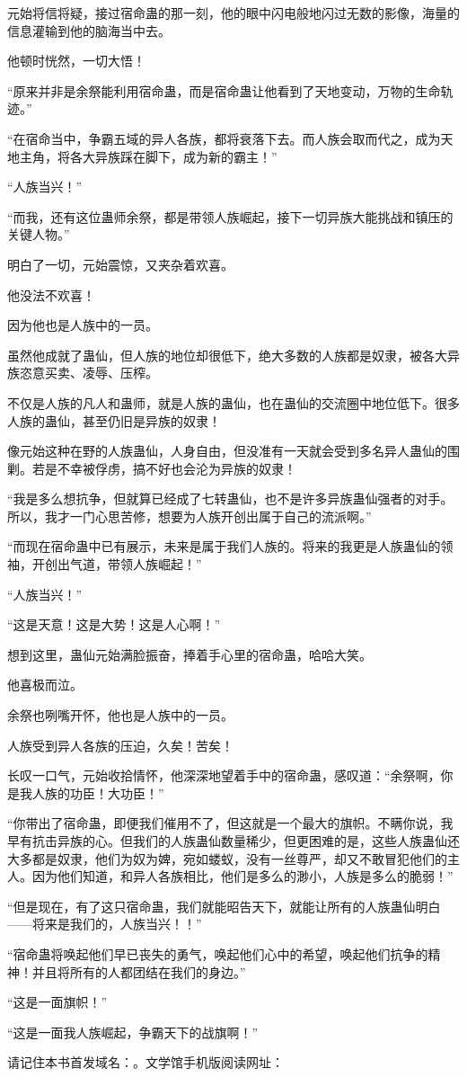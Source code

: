 \begin{this_body}
元始将信将疑，接过宿命蛊的那一刻，他的眼中闪电般地闪过无数的影像，海量的信息灌输到他的脑海当中去。

他顿时恍然，一切大悟！

“原来并非是余祭能利用宿命蛊，而是宿命蛊让他看到了天地变动，万物的生命轨迹。”

“在宿命当中，争霸五域的异人各族，都将衰落下去。而人族会取而代之，成为天地主角，将各大异族踩在脚下，成为新的霸主！”

“人族当兴！”

“而我，还有这位蛊师余祭，都是带领人族崛起，接下一切异族大能挑战和镇压的关键人物。”

明白了一切，元始震惊，又夹杂着欢喜。

他没法不欢喜！

因为他也是人族中的一员。

虽然他成就了蛊仙，但人族的地位却很低下，绝大多数的人族都是奴隶，被各大异族恣意买卖、凌辱、压榨。

不仅是人族的凡人和蛊师，就是人族的蛊仙，也在蛊仙的交流圈中地位低下。很多人族的蛊仙，甚至仍旧是异族的奴隶！

像元始这种在野的人族蛊仙，人身自由，但没准有一天就会受到多名异人蛊仙的围剿。若是不幸被俘虏，搞不好也会沦为异族的奴隶！

“我是多么想抗争，但就算已经成了七转蛊仙，也不是许多异族蛊仙强者的对手。所以，我才一门心思苦修，想要为人族开创出属于自己的流派啊。”

“而现在宿命蛊中已有展示，未来是属于我们人族的。将来的我更是人族蛊仙的领袖，开创出气道，带领人族崛起！”

“人族当兴！”

“这是天意！这是大势！这是人心啊！”

想到这里，蛊仙元始满脸振奋，捧着手心里的宿命蛊，哈哈大笑。

他喜极而泣。

余祭也咧嘴开怀，他也是人族中的一员。

人族受到异人各族的压迫，久矣！苦矣！

长叹一口气，元始收拾情怀，他深深地望着手中的宿命蛊，感叹道：“余祭啊，你是我人族的功臣！大功臣！”

“你带出了宿命蛊，即便我们催用不了，但这就是一个最大的旗帜。不瞒你说，我早有抗击异族的心。但我们的人族蛊仙数量稀少，但更困难的是，这些人族蛊仙还大多都是奴隶，他们为奴为婢，宛如蝼蚁，没有一丝尊严，却又不敢冒犯他们的主人。因为他们知道，和异人各族相比，他们是多么的渺小，人族是多么的脆弱！”

“但是现在，有了这只宿命蛊，我们就能昭告天下，就能让所有的人族蛊仙明白——将来是我们的，人族当兴！！”

“宿命蛊将唤起他们早已丧失的勇气，唤起他们心中的希望，唤起他们抗争的精神！并且将所有的人都团结在我们的身边。”

“这是一面旗帜！”

“这是一面我人族崛起，争霸天下的战旗啊！”

请记住本书首发域名：。文学馆手机版阅读网址：

\end{this_body}

